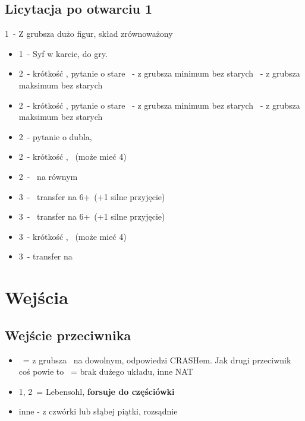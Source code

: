 \documentclass[12pt, a4paper]{article}
\begin{document}
\subsection{Licytacja po otwarciu 1\spades}
\begin{formal}
    1\spades\ - Z grubsza dużo figur, skład zrównoważony
\end{formal}
\begin{itemize}
    \item 1\nt\ - Syf w karcie, do gry.
    \item 2\clubs\ - krótkość \clubs, pytanie o stare
    \diams\ - z grubsza minimum bez starych
    \nt\ - z grubsza maksimum bez starych
    \item 2\diams\ - krótkość \diams, pytanie o stare
    \nt\ - z grubsza minimum bez starych
    \clubs\ - z grubsza maksimum bez starych
    \item 2\hearts\ - pytanie o dubla, \gf
    \item 2\spades\ - krótkość \spades, \gf\ (może mieć 4\hearts)
    \item 2\nt\ - \gf\ na równym
    \item 3\clubs\ - \gf\ transfer na 6+\hearts\ (+1 silne przyjęcie)
    \item 3\diams\ - \gf\ transfer na 6+\spades\ (+1 silne przyjęcie)
    \item 3\hearts\ - krótkość \hearts, \gf\ (może mieć 4\spades)
    \item 3\spades\ - transfer na \nt
\end{itemize}

\pagebreak
\section{Wejścia}
\subsection{Wejście przeciwnika}
\begin{itemize}
    \item \dbl\ = z grubsza \gf\ na dowolnym, odpowiedzi CRASHem. Jak drugi przeciwnik coś powie
    to \pass\ = brak dużego układu, inne NAT
    \item 1\nt, 2\nt\ = Lebensohl, \textbf{forsuje do częściówki}
    \item inne - z czwórki lub słąbej piątki, rozsądnie
\end{itemize}
\end{document}
